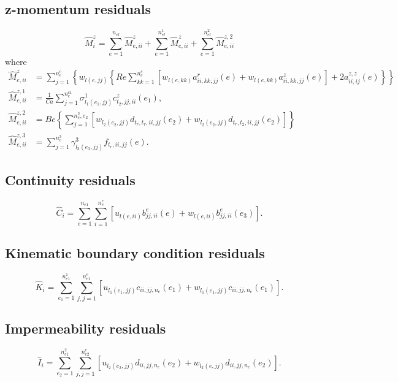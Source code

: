\documentclass{article}
\begin{document}
\subsection{z-momentum residuals}
\begin{equation}
\hat{M}_i^z = \sum_{e = 1}^{n_{el}}\hat{M}_{e,ii}^z +\sum_{e = 1}^{n_{el}^1}\hat{M}_{e,ii}^z +\sum_{e = 1}^{n_{el}^{2}}\hat{M}_{e,ii}^{z,2} \tag{17.6}
\end{equation}
where
\begin{align}
\hat{M}_{e,ii}^{z} &= \sum_{j = 1}^{n_{e}^{c}}\left\{w_{l(e,jj)}\left\{Re\sum_{kk = 1}^{n_{e}^{c}}\left[w_{l(e,kk)}a_{ii,kk,jj}^{r}(e) + w_{l(e,kk)}a_{ii,kk,jj}^{z}(e)\right] + 2a_{ii,ij}^{z,z}(e)\right\} \right\} \tag{17.7}\\
\hat{M}_{e,ii}^{z,1} &= \frac{1}{Ca}\sum_{j = 1}^{n_{e}^{c1}}\sigma_{l_{1}(e_{1},jj)}^{1}c_{t_{2},jj,ii}^{z}(e_{1}), \tag{17.8}\\
\hat{M}_{e,ii}^{z,2} &= Be\left\{\sum_{j = 1}^{n_{e}^{2},e_{2}}\left[w_{l_{2}(e_{2},jj)}d_{t_{r},t_{r},ii,jj}(e_{2}) + w_{l_{2}(e_{2},jj)}d_{t_{r},t_{2},ii,jj}(e_{2})\right]\right\} \tag{17.9}\\
\hat{M}_{e,ii}^{z,3} &= \sum_{j = 1}^{n_{e}^{3}}\gamma_{l_{3}(e_{3},jj)}^{3}f_{t_{r},ii,jj}(e). \tag{17.10}
\end{align}

\subsection{Continuity residuals}
\begin{equation}
\hat{C}_i = \sum_{e = 1}^{n_{e1}}\sum_{i = 1}^{n_e^e}\left[u_{l(e,ii)}b_{jj,ii}^e (e) + w_{l(e,ii)}b_{jj,ii}^e (e_3)\right]. \tag{17.11}
\end{equation}

\subsection{Kinematic boundary condition residuals}
\begin{equation}
\hat{K}_i = \sum_{e_1 = 1}^{n_{e1}^1}\sum_{j,j = 1}^{n_{e1}^e}\left[u_{l_1(e_1,jj)}c_{ii,jj,n_e}(e_1) + w_{l_1(e_1,jj)}c_{ii,jj,n_e}(e_{1})\right]. \tag{17.12}
\end{equation}

\subsection{Impermeability residuals}
\begin{equation}
\hat{I}_i = \sum_{e_2 = 1}^{n_{e1}^2}\sum_{j,j = 1}^{n_{e2}^e}\left[u_{l_2(e_2,jj)}d_{ii,jj,n_e}(e_2) + w_{l_2(e,jj)}d_{ii,jj,n_e}(e_2)\right]. \tag{17.13}
\end{equation}
\end{document}
